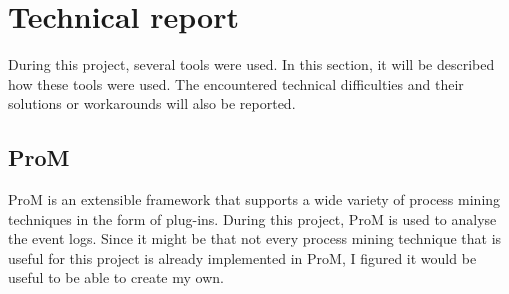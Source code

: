 \section{Technical report}
During this project, several tools were used. In this section, it will be described how these tools were used. The encountered technical difficulties and their solutions or workarounds will also be reported.

\subsection{ProM}
ProM is an extensible framework that supports a wide variety of process mining techniques in the form of plug-ins\cite{promTools}. 
During this project, ProM is used to analyse the event logs. Since it might be that not every process mining technique that is useful for this project is already implemented in ProM, I figured it would be useful to be able to create my own.

